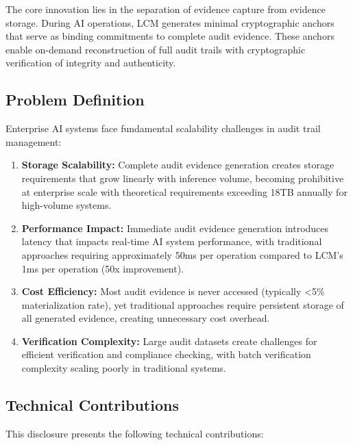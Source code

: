 \documentclass[12pt,a4paper]{article}
\begin{document}
The core innovation lies in the separation of evidence capture from evidence storage. During AI operations, LCM generates minimal cryptographic anchors that serve as binding commitments to complete audit evidence. These anchors enable on-demand reconstruction of full audit trails with cryptographic verification of integrity and authenticity.

\subsection{Problem Definition}

Enterprise AI systems face fundamental scalability challenges in audit trail management:

\begin{enumerate}
\item \textbf{Storage Scalability:} Complete audit evidence generation creates storage requirements that grow linearly with inference volume, becoming prohibitive at enterprise scale with theoretical requirements exceeding 18TB annually for high-volume systems.

\item \textbf{Performance Impact:} Immediate audit evidence generation introduces latency that impacts real-time AI system performance, with traditional approaches requiring approximately 50ms per operation compared to LCM's 1ms per operation (50x improvement).

\item \textbf{Cost Efficiency:} Most audit evidence is never accessed (typically <5\% materialization rate), yet traditional approaches require persistent storage of all generated evidence, creating unnecessary cost overhead.

\item \textbf{Verification Complexity:} Large audit datasets create challenges for efficient verification and compliance checking, with batch verification complexity scaling poorly in traditional systems.
\end{enumerate}

\subsection{Technical Contributions}

This disclosure presents the following technical contributions:
\end{document}
